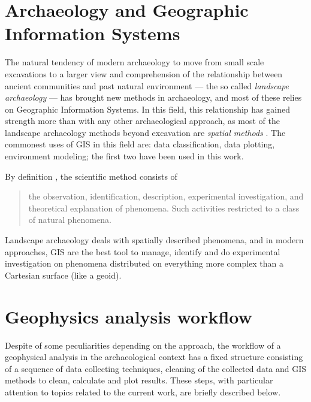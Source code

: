     \section{Archaeology and Geographic Information Systems}
        The natural tendency of modern archaeology to move from small scale excavations to a larger view and comprehension of the relationship between ancient communities and past natural environment --- the so called \emph{landscape archaeology} --- has brought new methods in archaeology, and most of these relies on Geographic Information Systems. In this field, this relationship has gained strength more than with any other archaeological approach, as most of the landscape archaeology methods beyond excavation are \emph{spatial methods} \cite[preface]{space-archaeology}. The commonest uses of GIS in this field are: data classification, data plotting, environment modeling; the first two have been used in this work.

        By definition \cite{american-dict}, the scientific method consists of
        \begin{quote}
            the observation, identification, description, experimental investigation, and theoretical explanation of phenomena. Such activities restricted to a class of natural phenomena.
        \end{quote}
        Landscape archaeology deals with spatially described phenomena, and in modern approaches, GIS are the best tool to manage, identify and do experimental investigation on phenomena distributed on everything more complex than a Cartesian surface (like a geoid).

    \section{Geophysics analysis workflow}
        Despite of some peculiarities depending on the approach, the workflow of a geophysical analysis in the archaeological context has a fixed structure consisting of a sequence of data collecting techniques, cleaning of the collected data and GIS methods to clean, calculate and plot results. These steps, with particular attention to topics related to the current work, are briefly described below.

